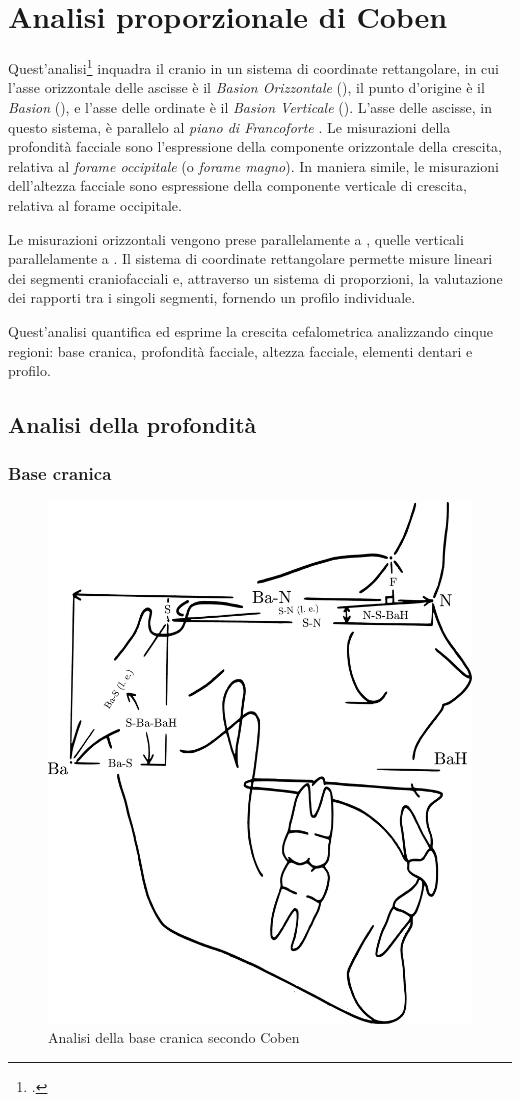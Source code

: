 \chapter{Analisi proporzionale di Coben}

Quest'analisi\footcite{Coben1979,Manetti1984,Coben1985,Antonini1986} inquadra il cranio in un sistema di coordinate rettangolare, in cui l'asse orizzontale delle ascisse è il \textit{Basion Orizzontale} (), il punto d'origine è il \textit{Basion} (), e l'asse delle ordinate è il \textit{Basion Verticale} (). L'asse delle ascisse, in questo sistema, è parallelo al \emph{piano di Francoforte} . Le misurazioni della profondità facciale sono l'espressione della componente orizzontale della crescita, relativa al \textit{forame occipitale} (o \textit{forame magno}). In maniera simile, le misurazioni dell'altezza facciale sono espressione della componente verticale di crescita, relativa al forame occipitale.

Le misurazioni orizzontali vengono prese parallelamente a , quelle verticali parallelamente a . Il sistema di coordinate rettangolare permette misure lineari dei segmenti craniofacciali e, attraverso un sistema di proporzioni, la valutazione dei rapporti tra i singoli segmenti, fornendo un profilo individuale.

Quest'analisi quantifica ed esprime la crescita cefalometrica analizzando cinque regioni: base cranica, profondità facciale, altezza facciale, elementi dentari e profilo.

\section{Analisi della profondità}
\subsection*{Base cranica}
\begin{figure}
\centering
\includegraphics[width=.6\columnwidth]{./images/coben_base_cranica.pdf}
\caption{Analisi della base cranica secondo Coben}
\label{fig:coben_base_cranica}
\end{figure}

